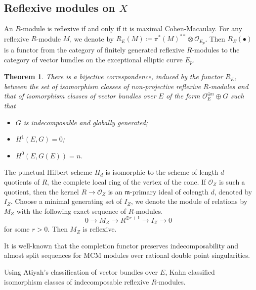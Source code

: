 \documentclass[12pt,oneside,reqno]{amsart}
\newtheorem{theorem}{Theorem}[section]
\theoremstyle{definition}
\begin{document}
\subsection{Reflexive modules on $X$}
An $R$-module is reflexive if and only if it is maximal Cohen-Macaulay. For any reflexive $R$-module $M$, we denote by $R_E(M) \coloneqq \pi^{*}(M)^{**} \otimes \mathcal{O}_{E_p}$. Then $R_E(\bullet)$ is a functor from the category of finitely generated reflexive $R$-modules to the category of vector bundles on the exceptional elliptic curve $E_p$.

\begin{theorem}
There is a bijective correspondence, induced by the functor $R_E$, between the set of isomorphism classes of non-projective reflexive $R$-modules and that of isomorphism classes of vector bundles over $E$ of the form $\mathcal{O}_E^{\oplus n} \oplus G$ such that 
\begin{itemize}
\item[(i)] $G$ is indecomposable and globally generated;
\item[(ii)] $H^1(E, G) = 0$;
\item[(iii)] $H^0(E, G(E)) = n$.
\end{itemize}
\end{theorem}

The punctual Hilbert scheme $H_d$ is isomorphic to the scheme of length $d$ quotients of $R$, the complete local ring of the vertex of the cone. If $\mathcal{O}_Z$ is such a quotient, then the kernel $R \to \mathcal{O}_Z$ is an $\mathfrak{m}$-primary ideal of colength $d$, denoted by $I_Z$. Choose a minimal generating set of $I_Z$, we denote the module of relations by $M_Z$ with the following exact sequence of $R$-modules.
\[
0 \to M_Z \to R^{\oplus r + 1} \to I_Z \to 0
\]
for some $r > 0$. Then $M_Z$ is reflexive. 

It is well-known that the completion functor preserves indecomposability and almost split sequences for MCM modules over rational double point singularities. 

Using Atiyah's classification of vector bundles over $E$, Kahn classified isomorphism classes of indecomposable reflexive $R$-modules.
\end{document}

